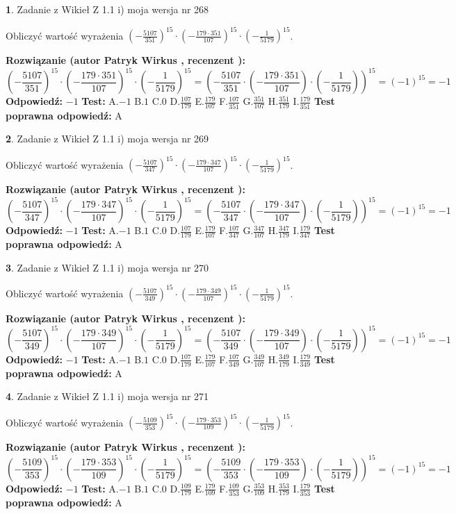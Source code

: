 \documentclass[12pt, a4paper]{article}
\theoremstyle{definition} %
\newtheorem{zad}{}
\newcommand{\zadStart}[1]{\begin{zad}#1\newline}
\newcommand{\zadStop}{\end{zad}}
\newcommand{\rozwStart}[2]{\noindent \textbf{Rozwiązanie (autor #1 , recenzent #2): }\newline}
\newcommand{\rozwStop}{\newline}
\newcommand{\odpStart}{\noindent \textbf{Odpowiedź:}\newline}
\newcommand{\odpStop}{\newline}
\newcommand{\testStart}{\noindent \textbf{Test:}\newline}
\newcommand{\testStop}{\newline}
\newcommand{\kluczStart}{\noindent \textbf{Test poprawna odpowiedź:}\newline}
\newcommand{\kluczStop}{\newline}
\begin{document}
\zadStart{Zadanie z Wikieł Z 1.1 i) moja wersja nr 268}

Obliczyć wartość wyrażenia $(-\frac{5107}{351})^{15} \cdot (-\frac{179 \cdot 351}{107})^{15} \cdot (-\frac{1}{5179})^{15}$.
\zadStop
\rozwStart{Patryk Wirkus}{}
$$(-\frac{5107}{351})^{15} \cdot (-\frac{179 \cdot 351}{107})^{15} \cdot (-\frac{1}{5179})^{15} = (-\frac{5107}{351} \cdot (-\frac{179 \cdot 351}{107}) \cdot (-\frac{1}{5179}))^{15} = (-1)^{15} = -1$$
\rozwStop
\odpStart
$-1$
\odpStop
\testStart
A.$-1$ B.$1$ C.$0$ D.$\frac{107}{179}$ E.$\frac{179}{107}$
F.$\frac{107}{351}$ G.$\frac{351}{107}$
H.$\frac{351}{179}$
I.$\frac{179}{351}$
\testStop
\kluczStart
A
\kluczStop



\zadStart{Zadanie z Wikieł Z 1.1 i) moja wersja nr 269}

Obliczyć wartość wyrażenia $(-\frac{5107}{347})^{15} \cdot (-\frac{179 \cdot 347}{107})^{15} \cdot (-\frac{1}{5179})^{15}$.
\zadStop
\rozwStart{Patryk Wirkus}{}
$$(-\frac{5107}{347})^{15} \cdot (-\frac{179 \cdot 347}{107})^{15} \cdot (-\frac{1}{5179})^{15} = (-\frac{5107}{347} \cdot (-\frac{179 \cdot 347}{107}) \cdot (-\frac{1}{5179}))^{15} = (-1)^{15} = -1$$
\rozwStop
\odpStart
$-1$
\odpStop
\testStart
A.$-1$ B.$1$ C.$0$ D.$\frac{107}{179}$ E.$\frac{179}{107}$
F.$\frac{107}{347}$ G.$\frac{347}{107}$
H.$\frac{347}{179}$
I.$\frac{179}{347}$
\testStop
\kluczStart
A
\kluczStop



\zadStart{Zadanie z Wikieł Z 1.1 i) moja wersja nr 270}

Obliczyć wartość wyrażenia $(-\frac{5107}{349})^{15} \cdot (-\frac{179 \cdot 349}{107})^{15} \cdot (-\frac{1}{5179})^{15}$.
\zadStop
\rozwStart{Patryk Wirkus}{}
$$(-\frac{5107}{349})^{15} \cdot (-\frac{179 \cdot 349}{107})^{15} \cdot (-\frac{1}{5179})^{15} = (-\frac{5107}{349} \cdot (-\frac{179 \cdot 349}{107}) \cdot (-\frac{1}{5179}))^{15} = (-1)^{15} = -1$$
\rozwStop
\odpStart
$-1$
\odpStop
\testStart
A.$-1$ B.$1$ C.$0$ D.$\frac{107}{179}$ E.$\frac{179}{107}$
F.$\frac{107}{349}$ G.$\frac{349}{107}$
H.$\frac{349}{179}$
I.$\frac{179}{349}$
\testStop
\kluczStart
A
\kluczStop



\zadStart{Zadanie z Wikieł Z 1.1 i) moja wersja nr 271}

Obliczyć wartość wyrażenia $(-\frac{5109}{353})^{15} \cdot (-\frac{179 \cdot 353}{109})^{15} \cdot (-\frac{1}{5179})^{15}$.
\zadStop
\rozwStart{Patryk Wirkus}{}
$$(-\frac{5109}{353})^{15} \cdot (-\frac{179 \cdot 353}{109})^{15} \cdot (-\frac{1}{5179})^{15} = (-\frac{5109}{353} \cdot (-\frac{179 \cdot 353}{109}) \cdot (-\frac{1}{5179}))^{15} = (-1)^{15} = -1$$
\rozwStop
\odpStart
$-1$
\odpStop
\testStart
A.$-1$ B.$1$ C.$0$ D.$\frac{109}{179}$ E.$\frac{179}{109}$
F.$\frac{109}{353}$ G.$\frac{353}{109}$
H.$\frac{353}{179}$
I.$\frac{179}{353}$
\testStop
\kluczStart
A
\kluczStop
\end{document}
